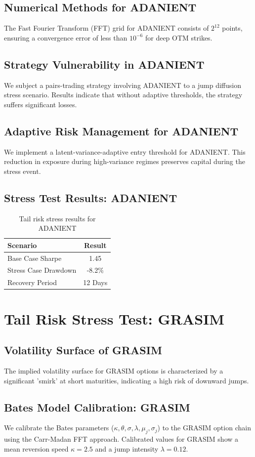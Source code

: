 \documentclass[12pt,a4paper,twoside]{article}
\begin{document}
\subsection{Numerical Methods for ADANIENT}
The Fast Fourier Transform (FFT) grid for ADANIENT consists of $2^{12}$ points, ensuring a convergence error of less than $10^{-6}$ for deep OTM strikes.
\subsection{Strategy Vulnerability in ADANIENT}
We subject a pairs-trading strategy involving ADANIENT to a jump diffusion stress scenario. Results indicate that without adaptive thresholds, the strategy suffers significant losses.
\subsection{Adaptive Risk Management for ADANIENT}
We implement a latent-variance-adaptive entry threshold for ADANIENT. This reduction in exposure during high-variance regimes preserves capital during the stress event.
\subsection{Stress Test Results: ADANIENT}
\begin{table}[H]
\centering
\begin{tabular}{|l|c|}
\hline
Scenario & Result \\
\hline
Base Case Sharpe & 1.45 \\
Stress Case Drawdown & -8.2\% \\
Recovery Period & 12 Days \\
\hline
\end{tabular}
\caption{Tail risk stress results for ADANIENT}
\end{table}
\newpage

\section{Tail Risk Stress Test: GRASIM}
\subsection{Volatility Surface of GRASIM}
The implied volatility surface for GRASIM options is characterized by a significant 'smirk' at short maturities, indicating a high risk of downward jumps.
\subsection{Bates Model Calibration: GRASIM}
We calibrate the Bates parameters ($\kappa, \theta, \sigma, \lambda, \mu_j, \sigma_j$) to the GRASIM option chain using the Carr-Madan FFT approach.
Calibrated values for GRASIM show a mean reversion speed $\kappa = 2.5$ and a jump intensity $\lambda = 0.12$.
\end{document}
